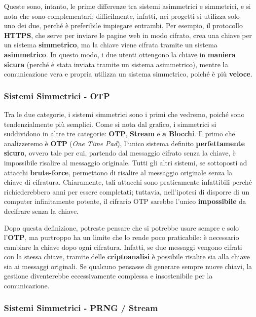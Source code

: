 \documentclass{report}
\begin{document}
Queste sono, intanto, le prime differenze tra sistemi asimmetrici e simmetrici, e si nota che sono complementari: difficilmente, infatti, nei progetti si utilizza solo uno dei due, perché è preferibile impiegare entrambi. Per esempio, il protocollo \textbf{HTTPS}, che serve per inviare le pagine web in modo cifrato, crea una chiave per un sistema \textbf{simmetrico}, ma la chiave viene cifrata tramite un sistema \textbf{asimmetrico}. In questo modo, i due utenti ottengono la chiave in \textbf{maniera sicura} (perché è stata inviata tramite un sistema asimmetrico), mentre la comunicazione vera e propria utilizza un sistema simmetrico, poiché è più \textbf{veloce}.

\newpage

\subsubsection{Sistemi Simmetrici - OTP}

Tra le due categorie, i sistemi simmetrici sono i primi che vedremo, poiché sono tendenzialmente più semplici. Come si nota dal grafico, i simmetrici si suddividono in altre tre categorie: \textbf{OTP}, \textbf{Stream} e \textbf{a Blocchi}. Il primo che analizzeremo è \textbf{OTP} (\textit{One Time Pad}), l’unico sistema definito \textbf{perfettamente sicuro}, ovvero tale per cui, partendo dal messaggio cifrato senza la chiave, è impossibile risalire al messaggio originale. Tutti gli altri sistemi, se sottoposti ad attacchi \textbf{brute-force}, permettono di risalire al messaggio originale senza la chiave di cifratura. Chiaramente, tali attacchi sono praticamente infattibili perché richiederebbero anni per essere completati; tuttavia, nell’ipotesi di disporre di un computer infinitamente potente, il cifrario OTP sarebbe l’unico \textbf{impossibile} da decifrare senza la chiave.

Dopo questa definizione, potreste pensare che si potrebbe usare sempre e solo l’\textbf{OTP}, ma purtroppo ha un limite che lo rende poco praticabile: è necessario cambiare la chiave dopo ogni cifratura. Infatti, se due messaggi vengono cifrati con la stessa chiave, tramite delle \textbf{criptoanalisi} è possibile risalire sia alla chiave sia ai messaggi originali. Se qualcuno pensasse di generare sempre nuove chiavi, la gestione diventerebbe eccessivamente complessa e insostenibile per la comunicazione.

\subsubsection{Sistemi Simmetrici - PRNG / Stream}
\end{document}
